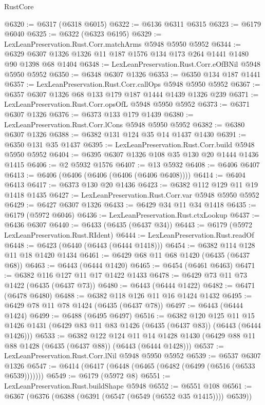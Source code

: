 \begin{lexlean}{RustCore}
\begin{coremodule}
@6320 := @6317 (@6318 @6015)
@6322 := @6136 @6311 @6315
@6323 := @6179 @6040
@6325 := @6322 (@6323 @6195)
@6329 := LexLeanPreservation.Rust.Corr.matchArms @5948 @5950 @5952
@6344 := @6329 @6307 @1326 @1326 @11 @187 @1576 @134 @173 @264 @1441 @1480 @90 @1398 @68 @1404
@6348 := LexLeanPreservation.Rust.Corr.eOfBNil @5948 @5950 @5952
@6350 := @6348 @6307 @1326
@6353 := @6350 @134 @187 @1441
@6357 := LexLeanPreservation.Rust.Corr.callOps @5948 @5950 @5952
@6367 := @6357 @6307 @1326 @68 @133 @179 @187 @1444 @1439 @1326 @239
@6371 := LexLeanPreservation.Rust.Corr.opsOfL @5948 @5950 @5952
@6373 := @6371 @6307 @1326
@6376 := @6373 @133 @179 @1439
@6380 := LexLeanPreservation.Rust.Corr.lCons @5948 @5950 @5952
@6382 := @6380 @6307 @1326
@6388 := @6382 @131 @124 @35 @14 @1437 @1430
@6391 := @6350 @131 @35 @1437
@6395 := LexLeanPreservation.Rust.Corr.build @5948 @5950 @5952
@6404 := @6395 @6307 @1326 @108 @35 @130 @20 @1444 @1436 @1415
@6406 := @2 @5932 @1576
@6407 := @13 @5932
@6408 := @6406 @6407
@6413 := @6406 (@6406 (@6406 (@6406 (@6406 @6408))))
@6414 := @6404 @6413
@6417 := @6373 @130 @20 @1436
@6423 := @6382 @112 @129 @11 @19 @1418 @1435
@6427 := LexLeanPreservation.Rust.Corr.var @5948 @5950 @5952
@6429 := @6427 @6307 @1326
@6433 := @6429 @34 @11 @34 @1418
@6435 := @6179 (@5972 @6046)
@6436 := LexLeanPreservation.Rust.ctxLookup
@6437 := @6436 @6307
@6440 := @6433 (@6435 (@6437 @34))
@6443 := @6179 (@5972 LexLeanPreservation.Rust.RIdent)
@6444 := LexLeanPreservation.Rust.readOf
@6448 := @6423 (@6440 (@6443 (@6444 @1418)))
@6454 := @6382 @114 @128 @11 @18 @1420 @1434
@6461 := @6429 @68 @11 @68 @1420 (@6435 (@6437 @68))
@6463 := @6443 (@6444 @1420)
@6465 := @6454 (@6461 @6463)
@6471 := @6382 @116 @127 @11 @17 @1422 @1433
@6478 := @6429 @73 @11 @73 @1422 (@6435 (@6437 @73))
@6480 := @6443 (@6444 @1422)
@6482 := @6471 (@6478 @6480)
@6488 := @6382 @118 @126 @11 @16 @1424 @1432
@6495 := @6429 @78 @11 @78 @1424 (@6435 (@6437 @78))
@6497 := @6443 (@6444 @1424)
@6499 := @6488 (@6495 @6497)
@6516 := @6382
    @120
    @125
    @11
    @15
    @1426
    @1431
    (@6429 @83 @11 @83 @1426 (@6435 (@6437 @83)) (@6443 (@6444 @1426)))
@6533 := @6382
    @122
    @124
    @11
    @14
    @1428
    @1430
    (@6429 @88 @11 @88 @1428 (@6435 (@6437 @88)) (@6443 (@6444 @1428)))
@6537 := LexLeanPreservation.Rust.Corr.lNil @5948 @5950 @5952
@6539 := @6537 @6307 @1326
@6547 := @6414 (@6417 (@6448 (@6465 (@6482 (@6499 (@6516 (@6533 @6539)))))))
@6549 := @6179 (@5972 @8)
@6551 := LexLeanPreservation.Rust.buildShape @5948
@6552 := @6551 @108
@6561 := @6367 (@6376 (@6388 (@6391 (@6547 (@6549 (@6552 @35 @1415)))) @6539))

\end{coremodule}
\end{lexlean}

